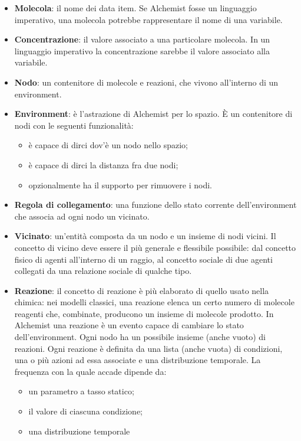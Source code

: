 \documentclass[12pt,a4paper,openright,twoside]{book}
\begin{document}
\begin{itemize}
    \item \textbf{Molecola}: il nome dei data item. Se Alchemist fosse un linguaggio imperativo, una molecola potrebbe rappresentare il nome di una variabile. 
    \item \textbf{Concentrazione}: il valore associato a una particolare molecola. In un linguaggio imperativo la concentrazione sarebbe il valore associato alla variabile. 
    \item \textbf{Nodo}: un contenitore di molecole e reazioni, che vivono all'interno di un environment. 
    \item \textbf{Environment}: è l'astrazione di Alchemist per lo spazio. È un contenitore di nodi con le seguenti funzionalità: 
    \begin{itemize}
        \item è capace di dirci dov'è un nodo nello spazio;
        \item è capace di dirci la distanza fra due nodi;
        \item opzionalmente ha il supporto per rimuovere i nodi.
    \end{itemize}
    \item \textbf{Regola di collegamento}: una funzione dello stato corrente dell'environment che associa ad ogni nodo un vicinato. 
    \item \textbf{Vicinato}: un'entità composta da un nodo e un insieme di nodi vicini. Il concetto di vicino deve essere il più generale e flessibile possibile: dal concetto fisico di agenti all'interno di un raggio, al concetto sociale di due agenti collegati da una relazione sociale di qualche tipo. 
    \item \textbf{Reazione}: il concetto di reazione è più elaborato di quello usato nella chimica: nei modelli classici, una reazione elenca un certo numero di molecole reagenti che, combinate, producono un insieme di molecole prodotto. In Alchemist una reazione è un evento capace di cambiare lo stato dell'environment. Ogni nodo ha un possibile insieme (anche vuoto) di reazioni. Ogni reazione è definita da una lista (anche vuota) di condizioni, una o più azioni ad essa associate e una distribuzione temporale. La frequenza con la quale accade dipende da:
    \begin{itemize}
        \item un parametro a tasso statico; 
        \item il valore di ciascuna condizione; 
        \item una distribuzione temporale

\end{itemize}
\end{itemize}
\end{document}
